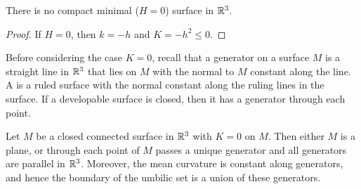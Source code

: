 \documentclass[../main]{subfiles}
\begin{document}
\begin{corollary} \label{cor:ch3.2.5}
There is no compact minimal ($H = 0$) surface in $\mathbb{R}^3$.
\end{corollary}

\begin{proof}
If $H = 0$, then $k = -h$ and $K = -h^2 \le 0$.
\end{proof}



Before considering the case $K = 0$, recall that a generator on a surface $M$ is a straight line in $\mathbb{R}^3$ that lies on $M$ with the normal to $M$ constant along the line. A  is a ruled surface with the normal constant along the ruling lines in the surface. If a developable surface is closed, then it has a generator through each point. 



\begin{theorem} \label{thm:ch3.2.6}
Let $M$ be a closed connected surface in $\mathbb{R}^3$ with $K = 0$ on $M$. Then either $M$ is a plane, or through each point of $M$ passes a unique generator and all generators are parallel in $\mathbb{R}^3$. Moreover, the mean curvature is constant along generators, and hence the boundary of the umbilic set is a union of these generators.
\end{theorem}
\end{document}
